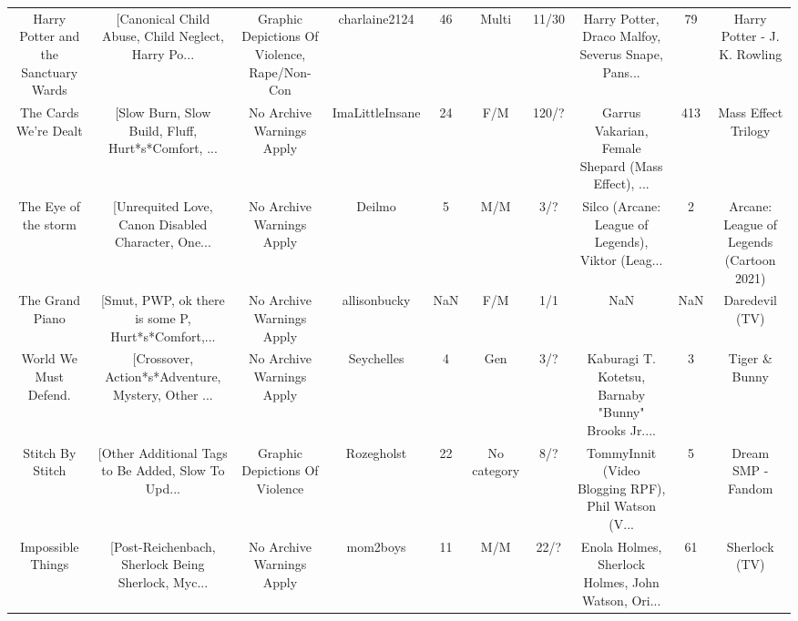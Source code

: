 \begin{table}[h!]
{\begin{tabular}{|c|c|c|c|c|c|c|c|c|c|}
              Harry Potter and the Sanctuary Wards & [Canonical Child Abuse, Child Neglect, Harry Po... &       Graphic Depictions Of Violence, Rape/Non-Con &                      charlaine2124 &        46 &                            Multi &    11/30 & Harry Potter, Draco Malfoy, Severus Snape, Pans... &       79 &                       Harry Potter - J. K. Rowling \\
                             The Cards We're Dealt & [Slow Burn, Slow Build, Fluff, Hurt*s*Comfort, ... &                          No Archive Warnings Apply &                    ImaLittleInsane &        24 &                              F/M &    120/? & Garrus Vakarian, Female Shepard (Mass Effect), ... &      413 &                                Mass Effect Trilogy \\
                              The Eye of the storm & [Unrequited Love, Canon Disabled Character, One... &                          No Archive Warnings Apply &                             Deilmo &         5 &                              M/M &      3/? & Silco (Arcane: League of Legends), Viktor (Leag... &        2 &           Arcane: League of Legends (Cartoon 2021) \\
                                   The Grand Piano & [Smut, PWP, ok there is some P, Hurt*s*Comfort,... &                          No Archive Warnings Apply &                       allisonbucky &       NaN &                              F/M &      1/1 &                                                NaN &      NaN &                                     Daredevil (TV) \\
                             World We Must Defend. & [Crossover, Action*s*Adventure, Mystery, Other ... &                          No Archive Warnings Apply &                         Seychelles &         4 &                              Gen &      3/? & Kaburagi T. Kotetsu, Barnaby "Bunny" Brooks Jr.... &        3 &                                      Tiger \& Bunny \\
                                  Stitch By Stitch & [Other Additional Tags to Be Added, Slow To Upd... &                     Graphic Depictions Of Violence &                         Rozegholst &        22 &                      No category &      8/? & TommyInnit (Video Blogging RPF), Phil Watson (V... &        5 &                                 Dream SMP - Fandom \\
                                 Impossible Things & [Post-Reichenbach, Sherlock Being Sherlock, Myc... &                          No Archive Warnings Apply &                           mom2boys &        11 &                              M/M &     22/? & Enola Holmes, Sherlock Holmes, John Watson, Ori... &       61 &                                      Sherlock (TV) \\

\end{tabular}}
\end{table}
